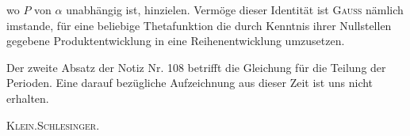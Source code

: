 \noindent wo \(P\) von \(\alpha\) unabhängig ist, hinzielen. Vermöge dieser Identität ist \textsc{Gauss} nämlich imstande, für eine beliebige Thetafunktion die durch Kenntnis ihrer Nullstellen gegebene Produktentwicklung in eine Reihenentwicklung umzusetzen.
\par\indent Der zweite Absatz der Notiz Nr. 108 betrifft die Gleichung für die Teilung der Perioden. Eine darauf bezügliche Aufzeichnung aus dieser Zeit ist uns nicht erhalten.
\par\noindent\hfill\textsc{Klein.\quad Schlesinger.}
\par\endgroup
